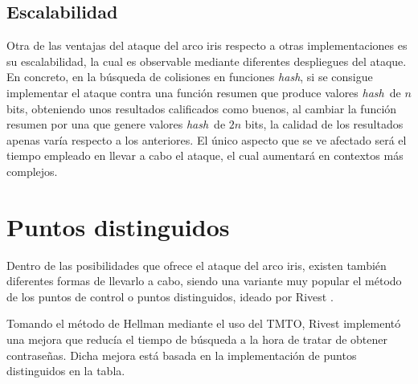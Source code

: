 \documentclass[12pt,spanish,listoffigures,listoftables,listofalgorithms]{tfgetsinf}
\newcommand{\hash}{\textit{hash}}
\begin{document}
\subsection{Escalabilidad}

Otra de las ventajas del ataque del arco iris respecto a otras implementaciones es su escalabilidad, la cual es observable mediante diferentes despliegues del ataque. En concreto, en la búsqueda de colisiones en funciones \hash, si se consigue implementar el ataque contra una función resumen que produce valores \hash~de $n$ bits, obteniendo unos resultados calificados como buenos, al cambiar la función resumen por una que genere valores \hash~de $2n$ bits, la calidad de los resultados apenas varía respecto a los anteriores. El único aspecto que se ve afectado será el tiempo empleado en llevar a cabo el ataque, el cual aumentará en contextos más complejos.

\section{Puntos distinguidos}\label{puntosdist}

Dentro de las posibilidades que ofrece el ataque del arco iris, existen también diferentes formas de llevarlo a cabo, siendo una variante muy popular el método de los puntos de control o puntos distinguidos, ideado por Rivest \cite{rivest}.

Tomando el método de Hellman \cite{hellman} mediante el uso del TMTO, Rivest implementó una mejora que reducía el tiempo de búsqueda a la hora de tratar de obtener contraseñas. Dicha mejora está basada en la implementación de puntos distinguidos en la tabla.
\end{document}
